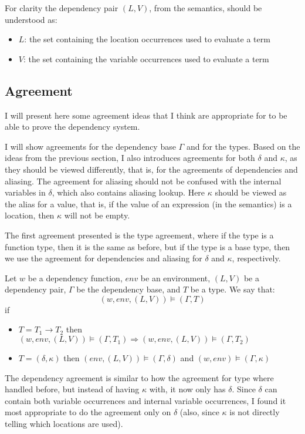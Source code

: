 \documentclass[../../master.tex]{subfiles}
\begin{document}
For clarity the dependency pair $(L,V)$, from the semantics, should be understood as:
\begin{itemize}
	\item $L$: the set containing the location occurrences used to evaluate a term
	\item $V$: the set containing the variable occurrences used to evaluate a term
\end{itemize}

\subsection{Agreement}
I will present here some agreement ideas that I think are appropriate for to be able to prove the dependency system.

I will show agreements for the dependency base $\Gamma$ and for the types.
Based on the ideas from the previous section, I also introduces agreements for both $\delta$ and $\kappa$, as they should be viewed differently, that is, for the agreements of dependencies and aliasing.
The agreement for aliasing should not be confused with the internal variables in $\delta$, which also contains aliasing lookup.
Here $\kappa$ should be viewed as the alias for a value, that is, if the value of an expression (in the semantics) is a location, then $\kappa$ will not be empty.
\bigskip

The first agreement presented is the type agreement, where if the type is a function type, then it is the same as before, but if the type is a base type, then we use the agreement for dependencies and aliasing for $\delta$ and $\kappa$, respectively.
\begin{definition}
	Let $w$ be a dependency function, $env$ be an environment, $(L,V)$ be a dependency pair, $\Gamma$ be the dependency base, and $T$ be a type.
	We say that:
	$$(w,env,(L,V))\models(\Gamma,T)$$
	if
	\begin{itemize}
		\item $T=T_1\rightarrow T_2$ then $(w,env,(L,V))\models(\Gamma,T_1)\Rightarrow(w,env,(L,V))\models(\Gamma,T_2)$
		\item $T=(\delta,\kappa)$ then $(env,(L,V))\models(\Gamma,\delta)$ and $(w,env)\models(\Gamma,\kappa)$
	\end{itemize}
\end{definition}
\bigskip

The dependency agreement is similar to how the agreement for type where handled before, but instead of having $\kappa$ with, it now only has $\delta$.
Since $\delta$ can contain both variable occurrences and internal variable occurrences, I found it most appropriate to do the agreement only on $\delta$ (also, since $\kappa$ is not directly telling which locations are used).
\end{document}
